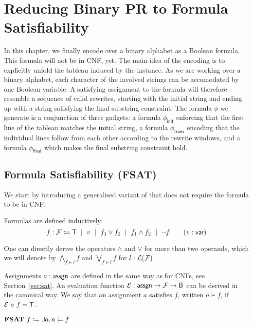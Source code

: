 
\chapter{Reducing Binary PR to Formula Satisfiability}\label{chap:bpr_fsat}
In this chapter, we finally encode \PR{} over a binary alphabet as a Boolean formula. This formula will not be in CNF, yet.
The main idea of the encoding is to explicitly unfold the tableau induced by the \BPR{} instance.
As we are working over a binary alphabet, each character of the involved strings can be accomodated by one Boolean variable. A satisfying assignment to the formula will therefore resemble a sequence of valid rewrites, starting with the initial string and ending up with a string satisfying the final substring constraint.
The formula $\phi$ we generate is a conjunction of three gadgets: a formula $\phi_{\textsf{init}}$ enforcing that the first line of the tableau matches the initial string, a formula $\phi_{\textsf{trans}}$ encoding that the individual lines follow from each other according to the rewrite windows, and a formula $\phi_{\textsf{final}}$ which makes the final substring constraint hold. 

\newcommand{\formula}{\mathcal{F}}
\section{Formula Satisfiability (FSAT)}
We start by introducing a generalised variant of \SAT{} that does not require the formula to be in CNF.

Formulas are defined inductively: 
\mnote{$\formula$}
\[f : \formula \defeq \btrue \bnfmid v \bnfmid f_1 \lor f_2 \bnfmid f_1 \land f_2 \bnfmid \lnot f \qquad (v : \bvar) \]

One can directly derive the operators $\land$ and $\lor$ for more than two operands, which we will denote by $\bigwedge_{f \in l} f$ and $\bigvee_{f \in l} f$ for $ l : \listsof{\formula}$. 

Assignments $a : \textsf{assgn}$ are defined in the same way as for CNFs, see Section~\ref{sec:sat}.
An evaluation function $\eval : \assgn \rightarrow \formula \rightarrow \bool$ can be derived in the canonical way. We say that an assignment $a$ satisfies $f$, written $a \models f$, if $\mathcal{E}~a~f = \mathsf{T}$.

\begin{definition}
  \mnote{\fsat{}}
  $\textbf{FSAT}{}~f \coloneqq \exists a, a \models f$
\end{definition}

